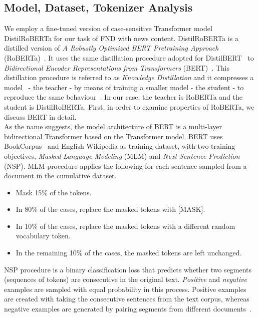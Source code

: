 \subsection{Model, Dataset, Tokenizer Analysis}
\label{subsec:newsContentModels_Model}
We employ a fine-tuned version of case-sensitive Transformer model DistilRoBERTa for our task of FND with news content. DistilRoBERTa is a distilled version of \emph{A Robustly Optimized BERT Pretraining Approach} (RoBERTa)~\parencite{RoBERTa_Liu}. It uses the same distillation procedure adopted for  DistilBERT~\parencite{DistilBERT_Sanh} to \emph{Bidirectional Encoder Representations from Transformers} (BERT)~\parencite{BERT_Devlin}. This distillation procedure is referred to as \emph{Knowledge Distillation} and it compresses a model~\parencite{ModelCompression_Bucilua} - the teacher - by means of training a smaller model - the student - to reproduce the same behaviour~\parencite{DistillingTheKnowledge_Hinton}. In our case, the teacher is  RoBERTa and the student is DistilRoBERTa. First, in order to examine properties of RoBERTa, we discuss BERT in detail.\\
As the name suggests, the model architecture of BERT is a multi-layer bidirectional Transformer based on the Transformer model. BERT uses BookCorpus~\parencite{BookCorpus_Yukun} and English Wikipedia as training dataset, with two training objectives, \emph{Masked Language Modeling} (MLM) and \emph{Next Sentence Prediction} (NSP). MLM procedure applies the following for each sentence sampled from a document in the cumulative dataset.
\begin{itemize}
    \item Mask 15\% of the tokens.
    \item In 80\% of the cases, replace the masked tokens with [MASK].
    \item In 10\% of the cases, replace the masked tokens with a different random vocabulary token.
    \item In the remaining 10\% of the cases, the masked tokens are left unchanged.
\end{itemize}
NSP procedure is a binary classification loss that predicts whether two segments (sequences of tokens) are consecutive in
the original text. \emph{Positive} and \emph{negative} examples are sampled with equal probability in this process.
Positive examples are created with taking the consecutive sentences from the text corpus, whereas negative examples
are generated by pairing segments from different documents~\parencite{RoBERTa_Liu}.\\
